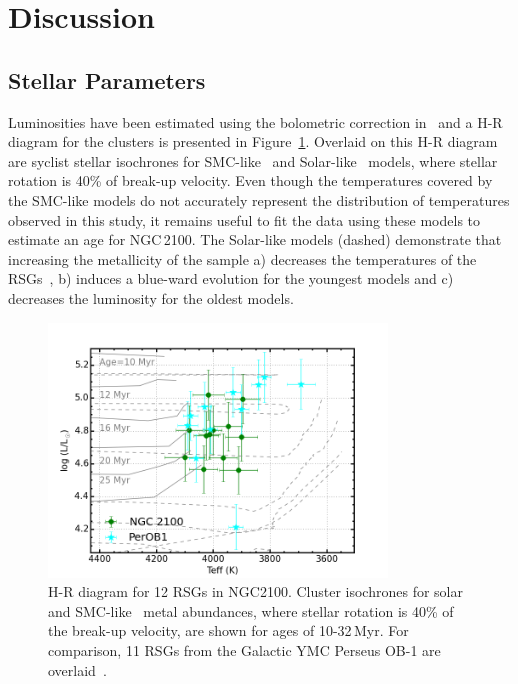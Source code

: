 \documentclass[useAMS,usenatbib]{mn2e}
\begin{document}

\section{Discussion} %
\label{sec:discussion}

\subsection{Stellar Parameters} %
\label{sub:stellar_parameters_disc}

Luminosities have been estimated using the bolometric correction in~\cite{2013ApJ...767....3D} and a H-R diagram for the clusters is presented in Figure~\ref{fig:HRD}.
Overlaid on this H-R diagram are {\sc syclist} stellar isochrones for SMC-like~\citep[solid lines,][]{2013A&A...558A.103G} and Solar-like~\citep[dashed lines,][]{2012A&A...537A.146E} models, where stellar rotation is 40\% of break-up velocity.
Even though the temperatures covered by the SMC-like models do not accurately represent the distribution of temperatures observed in this study, it remains useful to fit the data using these models to estimate an age for NGC\,2100.
The Solar-like models (dashed) demonstrate that increasing the metallicity of the sample
a) decreases the temperatures of the RSGs~\citep[something which is not observed by][]{2015ApJ...803...14P},
b) induces a blue-ward evolution for the youngest models and
c) decreases the luminosity for the oldest models.



\begin{figure}
 \includegraphics[width=9.0cm]{NGC2100-HRD-perOB1}
 \caption{H-R diagram for 12 RSGs in NGC2100.
  Cluster isochrones for solar~\citep[dashed lines;][]{2012A&A...537A.146E} and SMC-like~\citep[solid lines;][]{2013A&A...558A.103G} metal abundances,
  where stellar rotation is 40\% of the break-up velocity, are shown for ages of 10-32\,Myr. For comparison, 11 RSGs from the Galactic YMC Perseus OB-1 are overlaid~\citep{2014ApJ...788...58G}.\label{fig:HRD}
          }
\end{figure}
\end{document}
